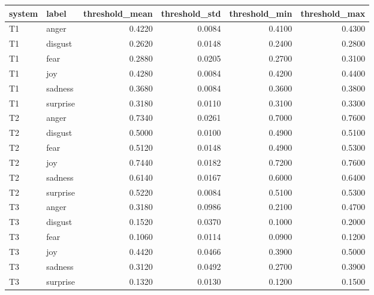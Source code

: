 \begin{tabular}{llrrrr}
\toprule
system & label & threshold_mean & threshold_std & threshold_min & threshold_max \\
\midrule
T1 & anger & 0.4220 & 0.0084 & 0.4100 & 0.4300 \\
T1 & disgust & 0.2620 & 0.0148 & 0.2400 & 0.2800 \\
T1 & fear & 0.2880 & 0.0205 & 0.2700 & 0.3100 \\
T1 & joy & 0.4280 & 0.0084 & 0.4200 & 0.4400 \\
T1 & sadness & 0.3680 & 0.0084 & 0.3600 & 0.3800 \\
T1 & surprise & 0.3180 & 0.0110 & 0.3100 & 0.3300 \\
T2 & anger & 0.7340 & 0.0261 & 0.7000 & 0.7600 \\
T2 & disgust & 0.5000 & 0.0100 & 0.4900 & 0.5100 \\
T2 & fear & 0.5120 & 0.0148 & 0.4900 & 0.5300 \\
T2 & joy & 0.7440 & 0.0182 & 0.7200 & 0.7600 \\
T2 & sadness & 0.6140 & 0.0167 & 0.6000 & 0.6400 \\
T2 & surprise & 0.5220 & 0.0084 & 0.5100 & 0.5300 \\
T3 & anger & 0.3180 & 0.0986 & 0.2100 & 0.4700 \\
T3 & disgust & 0.1520 & 0.0370 & 0.1000 & 0.2000 \\
T3 & fear & 0.1060 & 0.0114 & 0.0900 & 0.1200 \\
T3 & joy & 0.4420 & 0.0466 & 0.3900 & 0.5000 \\
T3 & sadness & 0.3120 & 0.0492 & 0.2700 & 0.3900 \\
T3 & surprise & 0.1320 & 0.0130 & 0.1200 & 0.1500 \\
\bottomrule
\end{tabular}
